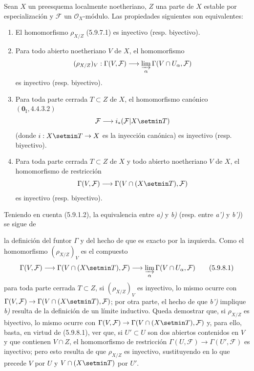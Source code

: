 \begin{proposition}[5.9.8]
Sean $X$ un preesquema localmente noetheriano, $Z$ una parte de $X$ estable
por especialización y $\mathcal F$ un $\mathcal O_X$-módulo. Las propiedades
siguientes son equivalentes:
\begin{enumerate}
\item[\textup{a)}] El homomorfismo $\rho_{X/Z}$ \textup{(5.9.7.1)} es inyectivo
(\textup{resp.} biyectivo).
\item[\textup{b)}] Para todo abierto noetheriano $V$ de $X$, el homomorfismo
\[
(\rho_{X/Z})_V:\Gamma(V,\mathcal F)\longrightarrow
\varinjlim_\alpha\Gamma(V\cap U_\alpha,\mathcal F)
\]
es inyectivo (\textup{resp.} biyectivo).
\item[\textup{a')}] Para toda parte cerrada $T\subset Z$ de $X$, el homomorfismo
canónico $(\mathbf{0}_{\mathrm I},4.4.3.2)$
\[
\mathcal F\longrightarrow i_*(\mathcal F|X\setmin T)
\]
(donde $i:X\setmin T\to X$ es la inyección canónica) es inyectivo
(\textup{resp.} biyectivo).
\item[\textup{b')}] Para toda parte cerrada $T\subset Z$ de $X$ y todo abierto
noetheriano $V$ de $X$, el homomorfismo de restricción
\[
\Gamma(V,\mathcal F)\longrightarrow
\Gamma(V\cap(X\setmin T),\mathcal F)
\]
es inyectivo (\textup{resp.} biyectivo).
\end{enumerate}
\end{proposition}

Teniendo en cuenta (5.9.1.2), la equivalencia entre \emph{a)} y \emph{b)}
(resp. entre \emph{a')} y \emph{b')}) se sigue de

la definición del funtor $\Gamma$ y del hecho de que es exacto por la
izquierda. Como el homomorfismo $(\rho_{X/Z})_V$ es el compuesto
\begin{equation}
\Gamma(V,\mathcal F)\longrightarrow
\Gamma(V\cap(X\setmin T),\mathcal F)\longrightarrow
\varinjlim_\alpha\Gamma(V\cap U_\alpha,\mathcal F)
\tag{5.9.8.1}\label{IV.2.s5.9.8.1-fr}
\end{equation}
para toda parte cerrada $T\subset Z$, si $(\rho_{X/Z})_V$ es inyectivo, lo
mismo ocurre con
$\Gamma(V,\mathcal F)\to\Gamma(V\cap(X\setmin T),\mathcal F)$; por otra parte, el
hecho de que \emph{b')} implique \emph{b)} resulta de la definición de un límite inductivo.
Queda demostrar que, si $\rho_{X/Z}$ es biyectivo, lo mismo ocurre con
$\Gamma(V,\mathcal F)\to\Gamma(V\cap(X\setmin T),\mathcal F)$ y, para ello, basta,
en virtud de (5.9.8.1), ver que, si $U'\subset U$ son dos abiertos contenidos
en $V$ y que contienen $V\cap Z$, el homomorfismo de restricción
$\Gamma(U,\mathcal F)\to\Gamma(U',\mathcal F)$ es inyectivo; pero esto resulta
de que $\rho_{X/Z}$ es inyectivo, sustituyendo en lo que precede $V$ por $U$
y $V\cap(X\setmin T)$ por $U'$.
